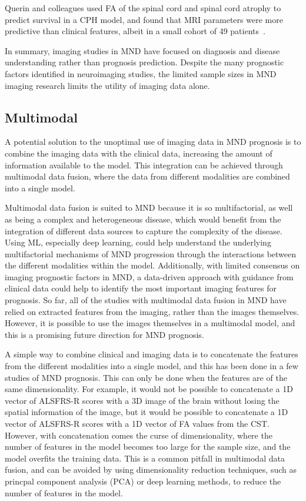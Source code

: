Querin and colleagues used FA of the spinal cord and spinal cord atrophy to predict survival in a CPH model, and found that MRI parameters were more predictive than clinical features, albeit in a small cohort of 49 patients~\cite{querinSpinalCordMultiparametric2017}.

In summary, imaging studies in MND have focused on diagnosis and disease understanding rather than prognosis prediction.
Despite the many prognostic factors identified in neuroimaging studies, the limited sample sizes in MND imaging research limits the utility of imaging data alone.

\subsection{Multimodal}

A potential solution to the unoptimal use of imaging data in MND prognosis is to combine the imaging data with the clinical data, increasing the amount of information available to the model.
This integration can be achieved through multimodal data fusion, where the data from different modalities are combined into a single model.

Multimodal data fusion is suited to MND because it is so multifactorial, as well as being a complex and heterogeneous disease, which would benefit from the integration of different data sources to capture the complexity of the disease.
Using ML, especially deep learning, could help understand the underlying multifactorial mechanisms of MND progression through the interactions between the different modalities within the model.
Additionally, with limited consensus on imaging prognostic factors in MND, a data-driven approach with guidance from clinical data could help to identify the most important imaging features for prognosis.
So far, all of the studies with multimodal data fusion in MND have relied on extracted features from the imaging, rather than the images themselves.
However, it is possible to use the images themselves in a multimodal model, and this is a promising future direction for MND prognosis.

A simple way to combine clinical and imaging data is to concatenate the features from the different modalities into a single model, and this has been done in a few studies of MND prognosis.
This can only be done when the features are of the same dimensionality.
For example, it would not be possible to concatenate a 1D vector of ALSFRS-R scores with a 3D image of the brain without losing the spatial information of the image, but it would be possible to concatenate a 1D vector of ALSFRS-R scores with a 1D vector of FA values from the CST.
However, with concatenation comes the curse of dimensionality, where the number of features in the model becomes too large for the sample size, and the model overfits the training data.
This is a common pitfall in multimodal data fusion, and can be avoided by using dimensionality reduction techniques, such as princpal component analysis (PCA) or deep learning methods, to reduce the number of features in the model.


